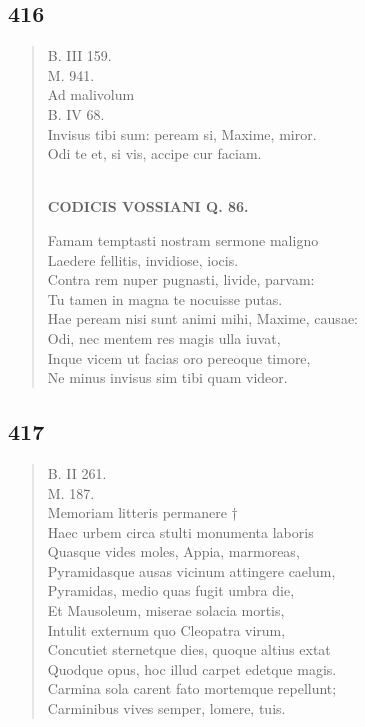 \documentclass[11pt, a4paper]{report}
\begin{document}
            \subsection*{416}
      \begin{verse}
      B. III 159. \\ M. 941. \\ Ad malivolum \\ B. IV 68. \\ Invisus tibi sum: peream si, Maxime, miror. \\ Odi te et, si vis, accipe cur faciam. \\ 
        ﻿\pagebreak 
    \begin{center} \textbf{CODICIS VOSSIANI Q. 86.} \end{center} \marginpar{[02]} Famam temptasti nostram sermone maligno \\ Laedere fellitis, invidiose, iocis. \\ Contra rem nuper pugnasti, livide, parvam: \\ Tu tamen in magna te nocuisse putas. \\ Hae peream nisi sunt animi mihi, Maxime, causae: \\ Odi, nec mentem res magis ulla iuvat, \\ Inque vicem ut facias oro pereoque timore, \\ Ne minus invisus sim tibi quam videor. \\ 
      \end{verse}
  
            \subsection*{417}
      \begin{verse}
      B. II 261. \\ M. 187. \\ Memoriam litteris permanere † \\ Haec urbem circa stulti monumenta laboris \\ Quasque vides moles, Appia, marmoreas, \\ Pyramidasque ausas vicinum attingere caelum, \\ Pyramidas, medio quas fugit umbra die, \\ Et Mausoleum, miserae solacia mortis, \\ Intulit externum quo Cleopatra virum, \\ Concutiet sternetque dies, quoque altius extat \\ Quodque opus, hoc illud carpet edetque magis. \\ Carmina sola carent fato mortemque repellunt; \\ Carminibus vives semper, lomere, tuis. \\ 
      \end{verse}
  
\end{document}
